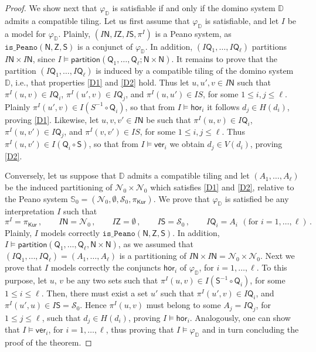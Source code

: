 \documentclass[submission,copyright,creativecommons]{eptcs}
\newcommand{\pairf}[1]{\pi^{#1}}
\newcommand{\inter}{I}
\newcommand{\ipairf}{\pairf{\inter}}
\newcommand{\dominoSys}{\mathbb{D}}
\newcommand{\peanSys}{\mathbb{S}}
\newcommand{\peanN}{\mathcal{N}}
\newcommand{\peanS}{\mathcal{S}}
\newcommand{\isPeanoSys}{\mathtt{is\_Peano}}
\newcommand{\isPartition}{\mathsf{partition}}
\newcommand{\partn}{A}
\newcommand{\mN}{\mathsf{N}}
\newcommand{\mQ}{\mathsf{Q}}
\newcommand{\mS}{\mathsf{S}}
\newcommand{\mZ}{\mathsf{Z}}
\newcommand{\horcom}{\mathsf{hor}}
\newcommand{\vercom}{\mathsf{ver}}
\begin{document}
\begin{proof}
We show next that $\varphi_{\dominoSys}$ is satisfiable if and only if
the domino system $\dominoSys$ admits a compatible tiling.
Let us first assume that $\varphi_{\dominoSys}$ is satisfiable, and
let $\inter$ be a model for $\varphi_{\dominoSys}$.  Plainly, $(\inter
\mN, \inter \mZ, \inter \mS, \ipairf)$ is a Peano system, as
$\isPeanoSys(\mN,\mZ,\mS)$ is a conjunct of $\varphi_{\dominoSys}$.
In addition, $(\inter \mQ_1, \ldots, \inter \mQ_\ell)$ partitions
$\inter \mN \times \inter \mN$, since $\inter \models
\isPartition(\mQ_1, \ldots, \mQ_\ell; \mN \times \mN)$.  It remains to
prove that the partition $(\inter \mQ_1, \ldots, \inter \mQ_\ell)$ is
induced by a compatible tiling of the domino system $\dominoSys$,
i.e., that properties \ref{D1} and \ref{D2} hold.  Thus let $u,u',v
\in \inter \mN$ such that $\ipairf(u,v) \in \inter \mQ_i$,
$\ipairf(u',v) \in \inter \mQ_j$, and $\ipairf(u,u') \in \inter S$,
for some $1 \leq i,j \leq \ell$.  Plainly $\ipairf(u',v) \in \inter
(S^{-1} \circ \mQ_i)$, so that from $\inter \models \horcom_i$ it
follows $d_j \in H(d_i)$, proving \ref{D1}.  Likewise, let $u,v,v' \in
\inter \mN$ be such that $\ipairf(u,v) \in \inter \mQ_i$,
$\ipairf(u,v') \in \inter \mQ_j$, and $\ipairf(v,v') \in \inter S$,
for some $1 \leq i,j \leq \ell$.  Thus $\ipairf(u,v') \in \inter
(\mQ_i \circ \mS)$, so that from $\inter \models \vercom_i$ we obtain
$d_j \in V(d_i)$, proving \ref{D2}.

Conversely, let us suppose that $\dominoSys$ admits a compatible
tiling and let $(\partn_1, \ldots, \partn_\ell)$ be the induced
partitioning of $\peanN_{0} \times \peanN_{0}$ which
satisfies \ref{D1} and \ref{D2}, relative to the Peano system
$\peanSys_{0}=(\peanN_{0}, \emptyset, \peanS_{0},
\pi_{\mathsf{Kur}})$.
We prove that $\varphi_{\dominoSys}$ is satisfied
be any interpretation $\inter$ such that
\[
  \ipairf = \pi_{\mathsf{Kur}}\,, \qquad 
  \inter \mN = \peanN_{0}\,, \qquad 
  \inter \mZ = \emptyset\,, \qquad 
  \inter \mS = \peanS_{0}\,, \qquad 
  \inter \mQ_i = \partn_i\, ~(\text{for } i=1,\ldots,\ell)\,.   
\]
Plainly, $\inter$ models correctly $\isPeanoSys(\mN,\mZ,\mS)$.  In
addition, $\inter \models \isPartition(\mQ_1, \ldots, \mQ_\ell, \mN
\times \mN)$, as we assumed that $(\inter \mQ_1, \ldots, \inter
\mQ_\ell)=(\partn_1, \ldots, \partn_\ell)$ is a partitioning of
$\inter \mN \times \inter \mN = \peanN_{0} \times \peanN_{0}$.
Next we prove that $\inter$ models correctly the conjuncts $\horcom_i$
of $\varphi_{\dominoSys}$, for $i = 1,\ldots, \ell$.  To this purpose,
let $u$, $v$ be any two sets such that $\ipairf(u,v) \in \inter
(\mS^{-1} \circ \mQ_i)$, for some $1 \leq i \leq \ell$.  Then, there
must exist a set $u'$ such that $\ipairf(u',v) \in \inter \mQ_i$, and
$\ipairf(u',u) \in \inter \mS = \peanS_{0}$.  Hence $\ipairf (u,v)$
must belong to some $\partn_j = \inter \mQ_{j}$, for $1 \leq j \leq
\ell$, such that $d_j \in H(d_i)$, proving $\inter \models \horcom_i$.
Analogously, one can show that $\inter \models \vercom_i$, for $i =
1,\ldots, \ell$, thus proving that $\inter \models
\varphi_{\dominoSys}$ and in turn concluding the proof of the theorem.
\end{proof}
\end{document}
